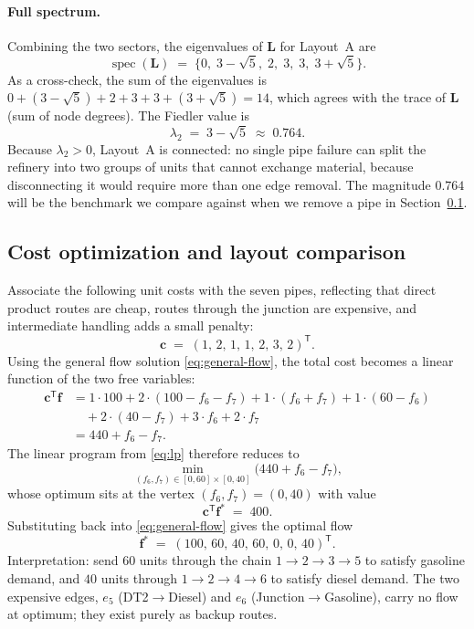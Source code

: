 \documentclass[11pt,a4paper]{article}
\newcommand{\mat}[1]{\mathbf{#1}}
\newcommand{\vect}[1]{\mathbf{#1}}
\newcommand{\transpose}{^{\mathsf{T}}}
\begin{document}
\paragraph{Full spectrum.}
Combining the two sectors, the eigenvalues of $\mat{L}$ for Layout~A
are
\begin{equation}
  \operatorname{spec}(\mat{L})
  \;=\;
  \bigl\{ 0,\; 3 - \sqrt{5},\; 2,\; 3,\; 3,\; 3 + \sqrt{5} \bigr\}.
  \label{eq:spec-A}
\end{equation}
As a cross-check, the sum of the eigenvalues is $0 + (3-\sqrt{5}) + 2
+ 3 + 3 + (3+\sqrt{5}) = 14$, which agrees with the trace of $\mat{L}$
(sum of node degrees). The Fiedler value is
\[
  \lambda_2
  \;=\; 3 - \sqrt{5}
  \;\approx\; 0.764.
\]
Because $\lambda_2 > 0$, Layout~A is connected: no single pipe failure
can split the refinery into two groups of units that cannot exchange
material, because disconnecting it would require more than one edge
removal. The magnitude $0.764$ will be the benchmark we compare against
when we remove a pipe in Section~\ref{sec:layout-comparison}.

\subsection{Cost optimization and layout comparison}
\label{sec:layout-comparison}

Associate the following unit costs with the seven pipes, reflecting
that direct product routes are cheap, routes through the junction are
expensive, and intermediate handling adds a small penalty:
\[
  \vect{c} \;=\; (1,\, 2,\, 1,\, 1,\, 2,\, 3,\, 2)\transpose.
\]
Using the general flow solution \eqref{eq:general-flow}, the total cost
becomes a linear function of the two free variables:
\begin{align*}
  \vect{c}\transpose \vect{f}
  &= 1 \cdot 100
    + 2 \cdot (100 - f_6 - f_7)
    + 1 \cdot (f_6 + f_7)
    + 1 \cdot (60 - f_6) \\
  &\quad {} + 2 \cdot (40 - f_7)
    + 3 \cdot f_6
    + 2 \cdot f_7 \\[2pt]
  &= 440 + f_6 - f_7.
\end{align*}
The linear program from \eqref{eq:lp} therefore reduces to
\[
  \min_{(f_6, f_7) \in [0, 60] \times [0, 40]}
  \bigl( 440 + f_6 - f_7 \bigr),
\]
whose optimum sits at the vertex $(f_6, f_7) = (0, 40)$ with value
\[
  \vect{c}\transpose \vect{f}^{*} \;=\; 400.
\]
Substituting back into \eqref{eq:general-flow} gives the optimal flow
\[
  \vect{f}^{*}
  \;=\;
  (100,\, 60,\, 40,\, 60,\, 0,\, 0,\, 40)\transpose.
\]
Interpretation: send $60$ units through the chain
$1 \to 2 \to 3 \to 5$ to satisfy gasoline demand, and $40$ units
through $1 \to 2 \to 4 \to 6$ to satisfy diesel demand. The two
expensive edges, $e_5$ (DT2$\to$Diesel) and $e_6$
(Junction$\to$Gasoline), carry no flow at optimum; they exist purely as
backup routes.
\end{document}
